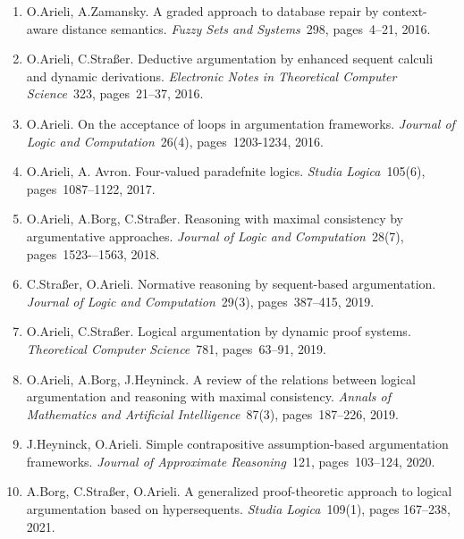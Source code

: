 \documentclass{article}
\begin{document}
\begin{enumerate}
    \item O.Arieli, A.Zamansky.
          A graded approach to database repair by context-aware distance semantics.
          {\em Fuzzy Sets and Systems\/}~298, pages~4--21, 2016.

    \item O.Arieli, C.Stra{\ss}er.
          Deductive argumentation by enhanced sequent calculi and dynamic derivations.
          {\em Electronic Notes in Theoretical Computer Science\/}~323, pages~21--37, 2016.

    \item O.Arieli.
          On the acceptance of loops in argumentation frameworks.
          {\em Journal of Logic and Computation\/}~26(4), pages~1203-1234, 2016.

    \item O.Arieli, A. Avron.
            Four-valued paradefnite logics. {\em Studia Logica\/}~105(6), pages~1087--1122, 2017.

   \item O.Arieli, A.Borg, C.Stra{\ss}er.
           Reasoning with maximal consistency by  argumentative approaches.
           {\em Journal of Logic and Computation\/}~28(7), pages~1523-–1563, 2018.

   \item C.Stra{\ss}er, O.Arieli.
            Normative reasoning by sequent-based argumentation.
            {\em Journal of Logic and Computation\/}~29(3), pages~387--415, 2019.

   \item O.Arieli, C.Stra{\ss}er.
             Logical argumentation by dynamic proof systems.
             {\em Theoretical Computer Science\/}~781, pages~63--91, 2019.

   \item O.Arieli, A.Borg, J.Heyninck.
            A review of the relations between logical argumentation and reasoning with maximal
            consistency. {\em Annals of Mathematics and Artificial Intelligence\/}~87(3),
            pages~187--226, 2019.

   \item J.Heyninck, O.Arieli.
           Simple contrapositive assumption-based argumentation frameworks.
           {\em Journal of Approximate Reasoning\/}~121, pages~103--124, 2020.

   \item A.Borg, C.Stra{\ss}er, O.Arieli.
           A generalized proof-theoretic approach to logical argumentation based on hypersequents.
           {\em Studia Logica\/}~109(1), pages 167--238, 2021.


\end{enumerate}
\end{document}
